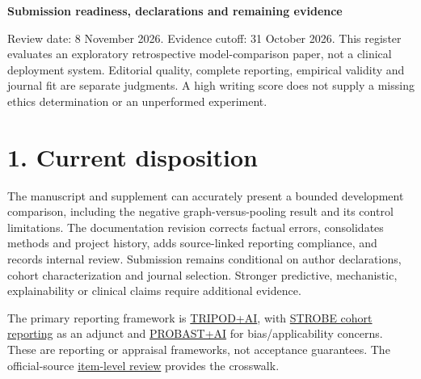 \documentclass[11pt,a4paper]{article}
\begin{document}
{\raggedright{}\LARGE\bfseries Submission readiness, declarations and remaining evidence\par}
\vspace{8pt}
Review date: 8 November 2026. Evidence cutoff: 31 October 2026. This register evaluates an exploratory retrospective model-comparison paper, not a clinical deployment system. Editorial quality, complete reporting, empirical validity and journal fit are separate judgments. A high writing score does not supply a missing ethics determination or an unperformed experiment.

\section*{1. Current disposition}
The manuscript and supplement can accurately present a bounded development comparison, including the negative graph-versus-pooling result and its control limitations. The documentation revision corrects factual errors, consolidates methods and project history, adds source-linked reporting compliance, and records internal review. Submission remains conditional on author declarations, cohort characterization and journal selection. Stronger predictive, mechanistic, explainability or clinical claims require additional evidence.

The primary reporting framework is \href{https://doi.org/10.1136/bmj-2023-078378}{TRIPOD+AI}, with \href{https://www.strobe-statement.org/checklists/}{STROBE cohort reporting} as an adjunct and \href{https://doi.org/10.1136/bmj-2024-082505}{PROBAST+AI} for bias/applicability concerns. These are reporting or appraisal frameworks, not acceptance guarantees. The official-source \href{reviews/reporting_standards_review_2026_11_08.md}{item-level review} provides the crosswalk.
\end{document}
